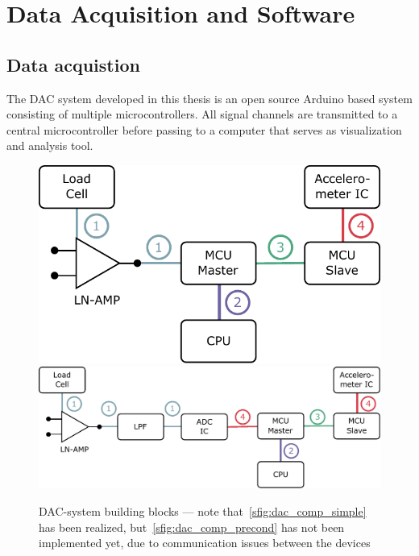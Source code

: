 \chapter{Data Acquisition and Software%
  \label{chap:\currfilebase}}

\section{Data acquistion}

The \ac{DAC} system developed in this thesis is an open source Arduino based system consisting of multiple microcontrollers. All signal channels are transmitted to a central microcontroller before passing to a computer that serves as visualization and analysis tool.

\begin{figure}[!htb]
  \centering
    {\includegraphics[scale=0.5]{figures/dac/dac_components/dac_comp_simple}}
    \hfill
    {\includegraphics[scale=0.5]{figures/dac/dac_components/dac_comp_precond}}
  \\[0.5em]
  \caption[DAC building blocks]{\acs{DAC}-system building blocks --- note that~\ref{sfig:dac_comp_simple} has been realized, but~\ref{sfig:dac_comp_precond} has not been implemented yet, due to communication issues between the devices%
    \label{fig:dac_building_blocks}}
\end{figure}

